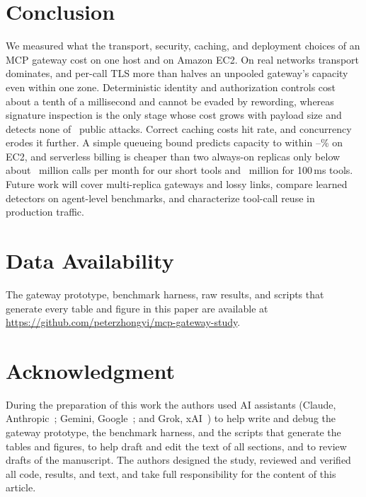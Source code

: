\documentclass{ieeeaccess}
\newcommand{\ms}{\,ms\xspace}
\begin{document}
\section{Conclusion}
\label{sec:conclusion}

We measured what the transport, security, caching, and deployment choices of an MCP gateway cost on one host and on Amazon EC2. On real networks transport dominates, and per-call TLS more than halves an unpooled gateway's capacity even within one zone. Deterministic identity and authorization controls cost about a tenth of a millisecond and cannot be evaded by rewording, whereas signature inspection is the only stage whose cost grows with payload size and detects none of \extAttacks\ public attacks. Correct caching costs hit rate, and concurrency erodes it further. A simple queueing bound predicts capacity to within \awMapeMin--\awMapeMax\% on EC2, and serverless billing is cheaper than two always-on replicas only below about \kBreakevenFg\ million calls per month for our short tools and \kBeFgHundred\ million for 100\ms tools. Future work will cover multi-replica gateways and lossy links, compare learned detectors on agent-level benchmarks, and characterize tool-call reuse in production traffic.

\section*{Data Availability}
The gateway prototype, benchmark harness, raw results, and scripts that generate every table and figure in this paper are available at \url{https://github.com/peterzhongyi/mcp-gateway-study}.

\section*{Acknowledgment}
During the preparation of this work the authors used AI assistants (Claude, Anthropic~\cite{anthropic2026claude}; Gemini, Google~\cite{google2026gemini}; and Grok, xAI~\cite{xai2026grok}) to help write and debug the gateway prototype, the benchmark harness, and the scripts that generate the tables and figures, to help draft and edit the text of all sections, and to review drafts of the manuscript. The authors designed the study, reviewed and verified all code, results, and text, and take full responsibility for the content of this article.



\end{document}
